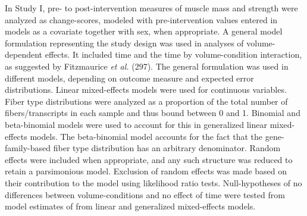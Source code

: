 \documentclass[twoside,10pt]{gihclass} %
\begin{document}
In Study I, pre- to post-intervention measures of muscle mass and strength were analyzed as change-scores, modeled with pre-intervention values entered in models as a covariate together with sex, when appropriate. A general model formulation representing the study design was used in analyses of volume-dependent effects. It included time and the time by volume-condition interaction, as suggested by Fitzmaurice \emph{et al.} (297).
The general formulation was used in different models, depending on outcome measure and expected error distributions.
Linear mixed-effects models were used for continuous variables.
Fiber type distributions were analyzed as a proportion of the total number of fibers/transcripts in each sample and thus bound between 0 and 1. Binomial and beta-binomial models were used to account for this in generalized linear mixed-effects models.
The beta-binomial model accounts for the fact that the gene-family-based fiber type distribution has an arbitrary denominator.
Random effects were included when appropriate, and any such structure was reduced to retain a parsimonious model. Exclusion of random effects was made based on their contribution to the model using likelihood ratio tests.
Null-hypotheses of no differences between volume-conditions and no effect of time were tested from model estimates of from linear and generalized mixed-effects models.
\end{document}
